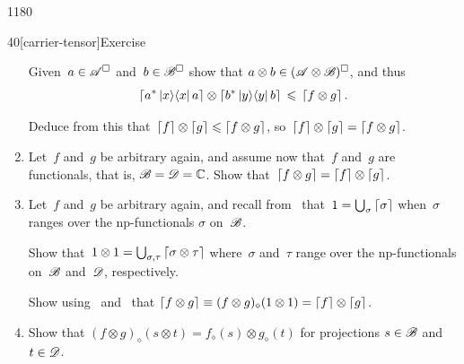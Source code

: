 \begin{parsec}{1180}
\begin{point}{40}[carrier-tensor]{Exercise}
\begin{enumerate}
Given~$a\in\scrA^\square$ and~$b\in\scrB^\square$
show that $a\otimes b \in (\scrA\otimes \scrB)^\square$,
and thus
\begin{equation*}
	\ceil{a^* \ketbra{x}{x}a}\otimes
\ceil{b^* \ketbra{y}{y}b} \,\leq\, \ceil{f\otimes g}.
\end{equation*}

Deduce from this that~$\ceil{f}\otimes \ceil{g}\leq \ceil{f\otimes g}$,
so~$\ceil{f}\otimes \ceil{g}= \ceil{f\otimes g}$.
\item
Let~$f$ and~$g$ be arbitrary again,
and assume now that~$f$ and~$g$ are functionals,
that is, $\mathscr{B}=\mathscr{D}=\mathbb{C}$.
Show that~$\left\lceil f\otimes g\right\rceil=\left\lceil f\right\rceil\otimes \left\lceil g\right\rceil$.
\item
Let~$f$ and~$g$ be arbitrary again,
and recall
from~
that~$1=\bigcup_{\sigma}\left\lceil\sigma\right\rceil$
when~$\sigma$ ranges over the np-functionals
$\sigma$ on~$\mathscr{B}$.

Show that~$1\otimes 1 
= \bigcup_{\sigma,\tau}\left\lceil\sigma \otimes \tau\right\rceil$
where~$\sigma$ and~$\tau$
range over the np-functionals
on~$\mathscr{B}$ and~$\mathscr{D}$, respectively.

Show using~
and~
that
$\left\lceil f\otimes g\right\rceil \equiv
(f\otimes g)_\diamond(1\otimes 1)
= \left\lceil f\right\rceil\otimes \left\lceil g\right\rceil$.
\item
Show that $(f\otimes g)_\diamond (s\otimes t)
= f_\diamond(s)\otimes g_\diamond(t)$
for projections
$s\in \mathscr{B}$
and~$t\in \mathscr{D}$.
\end{enumerate}
\spacingfix%
\end{point}%
\end{parsec}%
